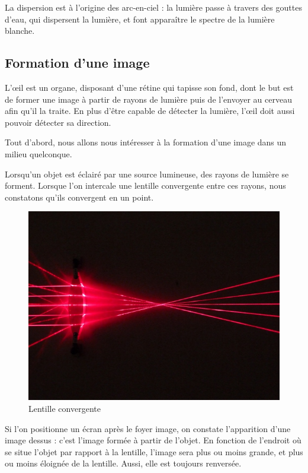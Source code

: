 \documentclass[a4paper, 12pt, onecolumn, openany]{report}
\begin{document}
	 La dispersion est à l’origine des arc-en-ciel : la lumière passe à travers des gouttes d’eau, qui dispersent la lumière, et font apparaître le spectre de la lumière blanche. 

		\subsection{Formation d'une image}
		L’œil est un organe, disposant d’une rétine qui tapisse son fond, dont le but est de former une image à partir de rayons de lumière puis de l’envoyer au cerveau afin qu’il la traite. En plus d’être capable de détecter la lumière, l’œil doit aussi pouvoir détecter sa direction. 
		
	Tout d’abord, nous allons nous intéresser à la formation d’une image dans un milieu quelconque.
	
	Lorsqu’un objet est éclairé par une source lumineuse, des rayons de lumière se forment. Lorsque l’on intercale une lentille convergente entre ces rayons, nous constatons qu’ils convergent en un point.
	
	\begin{figure}[h]
	\begin{center}
	\includegraphics[scale=0.3]{lentille_convergente.jpg}
	\end{center}
	\caption{Lentille convergente}
	\label{Lentille convergente}
	\end{figure}
		
	Si l’on positionne un écran après le foyer image, on constate l’apparition d’une image dessus : c’est l’image formée à partir de l’objet. En fonction de l’endroit où se situe l’objet par rapport à la lentille, l’image sera plus ou moins grande, et plus ou moins éloignée de la lentille. Aussi, elle est toujours renversée. 
	
\end{document}
